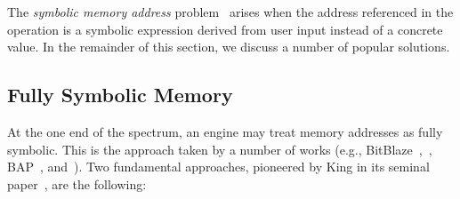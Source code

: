 The {\em symbolic memory address} problem~\cite{SAB-SP10} arises when the address referenced in the operation is a symbolic expression derived from user input instead of a concrete value. In the remainder of this section, we discuss a number of popular solutions.

\subsection{Fully Symbolic Memory}
\label{ss:fully-symbolic-memory}

At the one end of the spectrum, an engine may treat memory addresses as fully symbolic. This is the approach taken by a number of works (e.g., {\sc BitBlaze}~\cite{BITBLAZE-ICISS08},~\cite{TLL-CAV10}, {\sc BAP}~\cite{BAP-CAV11}, and~\cite{TS-ATVA14}). Two fundamental approaches, pioneered by King in its seminal paper~\cite{K-CACM76}, are the following:

